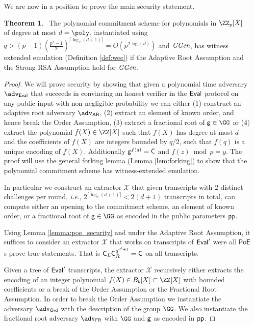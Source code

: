 \documentclass{article}
\theoremstyle{definition}
\newtheorem{theorem}{Theorem}
\begin{document}
We are now in a position to prove the main security statement.

\begin{theorem}~\label{thm:polycommitsecurity} 
	The polynomial commitment scheme for polynomials in $\ZZ_p[X]$ of degree at most $d=\poly$, instantiated using $q>(p-1)(\frac{p^2-1}{2})^{\lceil \log_2(d+1)\rceil}=O(p^{2\log(d)})$ and $\textit{GGen}$, has witness extended emulation (Definition \ref{def:wee}) if the Adaptive Root Assumption and the Strong RSA Assumption hold for $\textit{GGen}$.
\end{theorem}

\begin{proof}
We will prove security by showing that given a polynomial time adversary $\adv_{\eval}$ that succeeds in convincing an honest verifier in the $\textsf{{Eval}}$ protocol on any public input with non-negligible probability we can either (1) construct an adaptive root adversary $\adv_{\textsf{AR}}$, (2) extract an element of known order, and hence break the Order Assumption, (3) extract a fractional root of $\gr{g}\in \GG$ or (4) extract the polynomial $f(X)\in \ZZ[X]$ such that $f(X)$ has degree at most $d$ and the coefficients of $f(X)$ are integers bounded by $q/2$, such that $f(q)$ is a unique encoding of $f(X)$. Additionally $\mathsf{g}^{f(q)}=\mathsf{C}$ and $f(z) \bmod p=y$. The proof will use the general forking lemma (Lemma \ref{lem:forking}) to show that the polynomial commitment scheme has witness-extended emulation.

In particular we construct an extractor $\mathcal{X}$ that given transcripts with $2$ distinct challenges per round, \emph{i.e.}, $2^{\lceil\log_2(d+1)\rceil}<2 (d+1)$ transcripts in total, can compute either an opening to the commitment scheme, an element of known order, or a fractional root of $\gr{g}\in\GG$ as encoded in the public parameters $\textsf{pp}$.

Using Lemma \ref{lemma:poe_security} and under the Adaptive Root Assumption, it suffices to consider an extractor $\mathcal{X}$ that works on transcripts of $\textsf{{Eval}}'$ were all $\textsf{PoE}$s prove true statements. That is $\mathsf{C}_L\mathsf{C}_R^{q^{d'+1}}=\mathsf{C}$ on all transcripts.

Given a tree of $\textsf{{Eval}}'$ transcripts, the extractor $\mathcal{X}$ recursively either extracts the encoding of an integer polynomial $f(X)\in B_b[X]\subset \ZZ[X]$ with bounded coefficients or a break of the Order Assumption or the Fractional Root Assumption. 
In order to break the Order Assumption we instantiate the adversary $\adv_{\textsf{Ord}}$ with the description of the group $\GG$. We also instantiate the fractional root adversary $\adv_{\textsf{FR}}$ with $\GG$ and $\mathsf{g}$ as encoded in $\textsf{pp}$.


\end{proof}
\end{document}
